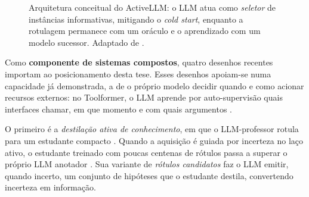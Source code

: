 \begin{figure}[htbp]
    \centering
    \caption{Arquitetura conceitual do ActiveLLM: o LLM atua como \emph{seletor} de
    instâncias informativas, mitigando o \textit{cold start}, enquanto a rotulagem
    permanece com um oráculo e o aprendizado com um modelo sucessor. Adaptado de
    \citet{Bayer2024ActiveLLM}.}
    \label{fig:activellm_arch}
\end{figure}

Como \textbf{componente de sistemas compostos}, quatro desenhos recentes
importam ao posicionamento desta tese. Esses desenhos apoiam-se numa
capacidade já demonstrada, a de o próprio modelo decidir quando e como
acionar recursos externos: no Toolformer, o LLM aprende por auto-supervisão quais interfaces
chamar, em que momento e com quais argumentos \citep{Schick2023}.

O primeiro é a \emph{destilação ativa de conhecimento}, em que o LLM-professor
rotula para um estudante compacto \citep{Xiao2023FreeAL}. Quando a aquisição é
guiada por incerteza no laço ativo, o estudante treinado com poucas centenas
de rótulos passa a superar o próprio LLM anotador \citep{Zhang2023LLMaAA}. Sua
variante de \emph{rótulos candidatos} \citep{Xia2025CanDist} faz o LLM emitir,
quando incerto, um conjunto de hipóteses que o estudante destila, convertendo
incerteza em informação.

